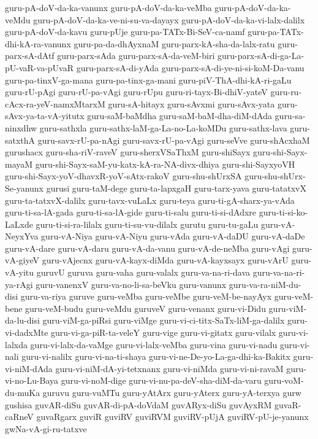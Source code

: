 {guru-pA-doV-da-ka-vanunx
guru-pA-doV-da-ka-veMba
guru-pA-doV-da-ka-veMdu
guru-pA-doV-da-ka-ve-ni-su-va-dayayx
guru-pA-doV-da-ka-vi-lalx-dalilx
guru-pA-doV-da-kavu
guru-pUje
guru-pa-TATx-Bi-SeV-ca-namf
guru-pa-TATx-dhi-kA-ra-vanunx
guru-pa-da-dhAyxnaM
guru-parx-kA-sha-da-lalx-ratu
guru-parx-sA-dAtf
guru-parx-sAda
guru-parx-sA-da-veM-biri
guru-parx-sA-di-ga-La-pU-vaR-va-pUvaR
guru-parx-sA-di-yAda
guru-parx-sA-di-ye-ni-si-koM-Da-vanu
guru-pa-tinxV-ga-mana
guru-pa-tinx-ga-mani
guru-piV-ThA-dhi-kA-ri-gaLu
guru-rU-pAgi
guru-rU-pa-vAgi
guru-rUpu
guru-ri-tayx-Bi-dhiV-yateV
guru-ru-cAcx-ra-yeV-namxMtarxM
guru-sA-hitayx
guru-sAvxmi
guru-sAvx-yata
guru-sAvx-ya-ta-vA-yitutx
guru-saM-baMdha
guru-saM-baM-dha-diM-dAda
guru-sa-ninxdhw
guru-sathxla
guru-sathx-laM-ga-La-no-La-koMDu
guru-sathx-lava
guru-satxthA
guru-savx-rU-pa-nAgi
guru-savx-rU-pa-vAgi
guru-seVve
guru-shAcxhaM
gurushacx
guru-sha-riV-raveV
guru-sherxVSaThxM
guru-shiSayx
guru-shi-Sayx-mayaM
guru-shi-Sayx-saM-yu-katx-kA-ra-NA-divx-dhiya
guru-shi-SayxyoVH
guru-shi-Sayx-yoV-dhavxR-yoV-sAtx-rakoV
guru-shu-shUrxSA
guru-shu-shUrx-Se-yanunx
gurusi
guru-taM-dege
guru-ta-lapxgaH
guru-tarx-yava
guru-tatatxvX
guru-ta-tatxvX-dalilx
guru-tavx-vuLaLx
guru-teya
guru-ti-gA-sharx-ya-vAda
guru-ti-sa-lA-gada
guru-ti-sa-lA-gide
guru-ti-salu
guru-ti-si-dAdxre
guru-ti-si-ko-LaLxde
guru-ti-si-ra-lilalx
guru-ti-su-vu-dilalx
gurutu
guru-tu-gaLu
guru-vA-NeyxYva
guru-vA-Niya
guru-vA-Niyu
guru-vAda
guru-vA-daDU
guru-vA-daDe
guru-vA-dare
guru-vA-daru
guru-vA-da-vanu
guru-vA-de-neMba
guru-vAgi
guru-vA-giyeV
guru-vAjecnx
guru-vA-kayx-diMda
guru-vA-kayxsayx
guru-vArU
guru-vA-yitu
guruvU
guruva
guru-vaha
guru-valalx
guru-va-na-ri-dava
guru-va-na-ri-ya-rAgi
guru-vanenxV
guru-va-no-li-sa-beVku
guru-vanunx
guru-va-ra-niM-du-disi
guru-va-riya
guruve
guru-veMba
guru-veMbe
guru-veM-be-nayAyx
guru-veM-bene
guru-veM-budu
guru-veMdu
guruveV
guru-venanx
guru-vi-Didu
guru-viM-da-lu-disi
guru-viM-ga-piRsi
guru-viMge
guru-vi-ci-titx-SaTx-liM-ga-dalilx
guru-vi-dadxMte
guru-vi-ga-piR-ta-veleY
guru-vige
guru-vi-gitatx
guru-vilalx
guru-vi-lalxda
guru-vi-lalx-da-vaMge
guru-vi-lalx-veMba
guru-vina
guru-vi-nadu
guru-vi-nali
guru-vi-nalilx
guru-vi-na-ti-shaya
guru-vi-ne-De-yo-La-ga-dhi-ka-Bakitx
guru-vi-niM-dAda
guru-vi-niM-dA-yi-tetxnanx
guru-vi-niMda
guru-vi-ni-ravaM
guru-vi-no-Lu-Baya
guru-vi-noM-dige
guru-vi-nu-pa-deV-sha-diM-da-varu
guru-voM-du-muKa
guruvu
guru-vuMTu
guru-yAtArx
guru-yAterx
guru-yA-terxya
gurw
gushisa
guvAR-diSu
guvAR-di-pA-doVdaM
guvARyx-diSu
guvAyxRM
guvaR-caRneV
guvaRgarx
guviR
guviRV
guviRVM
guviRV-pUjA
guviRV-pU-je-yanunx
gwNa-vA-gi-ru-tatxve
}

